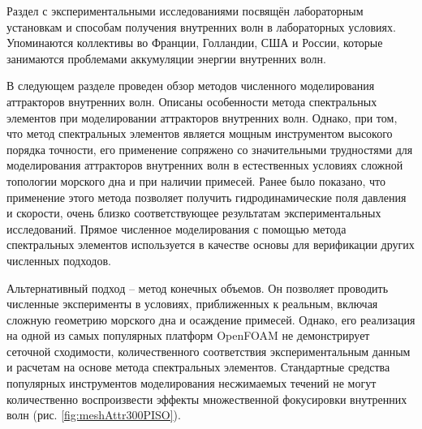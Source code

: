\documentclass[utf8x]{G7-32} %
\begin{document}
Раздел с экспериментальными исследованиями посвящён лабораторным установкам и способам получения внутренних волн в лабораторных условиях. Упоминаются коллективы во Франции, Голландии, США и России, которые занимаются проблемами аккумуляции энергии внутренних волн.

В следующем разделе проведен обзор методов численного моделирования аттракторов внутренних волн. Описаны особенности метода спектральных элементов при моделировании аттракторов внутренних волн. Однако, при том, что метод спектральных элементов является мощным инструментом высокого порядка точности, его применение сопряжено со значительными трудностями для моделирования аттракторов внутренних волн в естественных условиях сложной топологии морского дна и при наличии примесей.
Ранее было показано, что применение этого метода позволяет получить гидродинамические поля давления и скорости, очень близко соответствующее результатам экспериментальных исследований. Прямое численное моделирования с помощью метода спектральных элементов используется в качестве основы для верификации других численных подходов.

Альтернативный подход -- метод конечных объемов. Он позволяет проводить численные эксперименты в условиях, приближенных к реальным, включая сложную геометрию морского дна и осаждение примесей. Однако, его реализация на одной из самых популярных платформ OpenFOAM не демонстрирует сеточной сходимости, количественного соответствия экспериментальным данным и расчетам на основе метода спектральных элементов. 
Стандартные средства популярных инструментов моделирования несжимаемых течений не могут количественно воспроизвести эффекты множественной фокусировки внутренних волн (рис. \ref{fig:meshAttr300PISO}).
\end{document}
